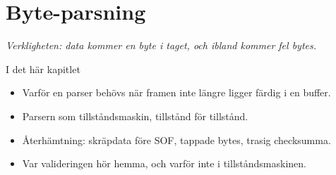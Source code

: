 \chapter{Byte-parsning}
\label{ch:parsning}


{\large\itshape Verkligheten: data kommer en byte i taget, och ibland kommer fel bytes.\par}

\begin{chapterbox}{I det här kapitlet}
\begin{itemize}
  \item Varför en parser behövs när framen inte längre ligger färdig i en buffer.
  \item Parsern som tillståndsmaskin, tillstånd för tillstånd.
  \item Återhämtning: skräpdata före SOF, tappade bytes, trasig checksumma.
  \item Var valideringen hör hemma, och varför inte i tillståndsmaskinen.
\end{itemize}
\end{chapterbox}





